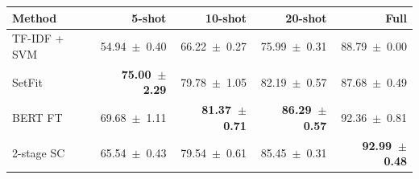 \begin{tabular}{@{}l@{\quad}r@{\quad}r@{\quad}r@{\quad}r@{}}\toprule Method & 5-shot & 10-shot & 20-shot & Full\\\midrule
TF-IDF + SVM
  & 54.94~$\pm$~0.40
  & 66.22~$\pm$~0.27
  & 75.99~$\pm$~0.31
  & 88.79~$\pm$~0.00\\
SetFit
  & \textbf{75.00~$\pm$~2.29}
  & 79.78~$\pm$~1.05
  & 82.19~$\pm$~0.57
  & 87.68~$\pm$~0.49\\
BERT FT
  & 69.68~$\pm$~1.11
  & \textbf{81.37~$\pm$~0.71}
  & \textbf{86.29~$\pm$~0.57}
  & 92.36~$\pm$~0.81\\
2-stage SC
  & 65.54~$\pm$~0.43
  & 79.54~$\pm$~0.61
  & 85.45~$\pm$~0.31
  & \textbf{92.99~$\pm$~0.48}\\
\bottomrule\end{tabular}